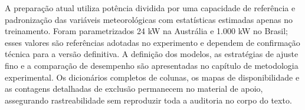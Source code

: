 A preparação atual utiliza potência dividida por uma capacidade de referência e padronização das variáveis meteorológicas com estatísticas estimadas apenas no treinamento. Foram parametrizados 24 kW na Austrália e 1.000 kW no Brasil; esses valores são referências adotadas no experimento e dependem de confirmação técnica para a versão definitiva. A definição dos modelos, as estratégias de ajuste fino e a comparação de desempenho são apresentadas no capítulo de metodologia experimental. Os dicionários completos de colunas, os mapas de disponibilidade e as contagens detalhadas de exclusão permanecem no material de apoio, assegurando rastreabilidade sem reproduzir toda a auditoria no corpo do texto.
